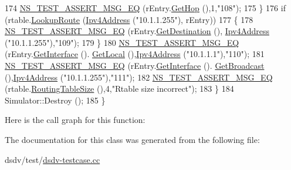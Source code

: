 \begin{DoxyCode}
174         \hyperlink{group__testing_ga2a9d78cffb3db8e867c35fff0b698cf5}{NS\_TEST\_ASSERT\_MSG\_EQ} (rEntry.\hyperlink{classns3_1_1dsdv_1_1RoutingTableEntry_a1d8272990e7a4e9f18ded6fa067c17d3}{GetHop} (),1,\textcolor{stringliteral}{"108"});
175       \}
176     \textcolor{keywordflow}{if} (rtable.\hyperlink{classns3_1_1dsdv_1_1RoutingTable_a0bfb9dc677f02bd740973865e38df763}{LookupRoute} (\hyperlink{classns3_1_1Ipv4Address}{Ipv4Address} (\textcolor{stringliteral}{"10.1.1.255"}), rEntry))
177       \{
178         \hyperlink{group__testing_ga2a9d78cffb3db8e867c35fff0b698cf5}{NS\_TEST\_ASSERT\_MSG\_EQ} (rEntry.\hyperlink{classns3_1_1dsdv_1_1RoutingTableEntry_accce1ae13754a9cfca9be827eb33e113}{GetDestination} (),
      \hyperlink{classns3_1_1Ipv4Address}{Ipv4Address} (\textcolor{stringliteral}{"10.1.1.255"}),\textcolor{stringliteral}{"109"});
179       \}
180     \hyperlink{group__testing_ga2a9d78cffb3db8e867c35fff0b698cf5}{NS\_TEST\_ASSERT\_MSG\_EQ} (rEntry.\hyperlink{classns3_1_1dsdv_1_1RoutingTableEntry_a96a71ac4efcc0c6bf7f6a914dd0698b6}{GetInterface} ().
      \hyperlink{classns3_1_1Ipv4InterfaceAddress_a716a425049f48b9fe6e38868b1f413f6}{GetLocal} (),\hyperlink{classns3_1_1Ipv4Address}{Ipv4Address} (\textcolor{stringliteral}{"10.1.1.1"}),\textcolor{stringliteral}{"110"});
181     \hyperlink{group__testing_ga2a9d78cffb3db8e867c35fff0b698cf5}{NS\_TEST\_ASSERT\_MSG\_EQ} (rEntry.\hyperlink{classns3_1_1dsdv_1_1RoutingTableEntry_a96a71ac4efcc0c6bf7f6a914dd0698b6}{GetInterface} ().
      \hyperlink{classns3_1_1Ipv4InterfaceAddress_aefd7b853e207b6776669bc3bcc2f3d72}{GetBroadcast} (),\hyperlink{classns3_1_1Ipv4Address}{Ipv4Address} (\textcolor{stringliteral}{"10.1.1.255"}),\textcolor{stringliteral}{"111"});
182     \hyperlink{group__testing_ga2a9d78cffb3db8e867c35fff0b698cf5}{NS\_TEST\_ASSERT\_MSG\_EQ} (rtable.\hyperlink{classns3_1_1dsdv_1_1RoutingTable_aaf031509f86a4a0ab0b0aaa1ba4e51e5}{RoutingTableSize} (),4,\textcolor{stringliteral}{"Rtable size
       incorrect"});
183   \}
184   Simulator::Destroy ();
185 \}
\end{DoxyCode}


Here is the call graph for this function\+:




The documentation for this class was generated from the following file\+:\begin{DoxyCompactItemize}
\item 
dsdv/test/\hyperlink{dsdv-testcase_8cc}{dsdv-\/testcase.\+cc}\end{DoxyCompactItemize}
